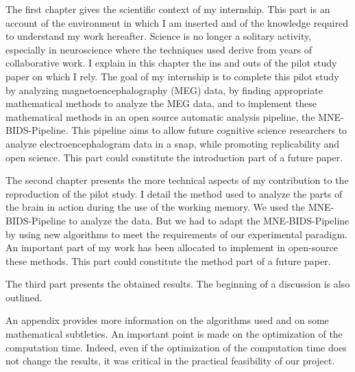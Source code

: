 The first chapter gives the scientific context of my internship. This part is an account of the environment in which I am inserted and of the knowledge required to understand my work hereafter. Science is no longer a solitary activity, especially in neuroscience where the techniques used derive from years of collaborative work. I explain in this chapter the ins and outs of the pilot study paper \cite{herbst2021abstracting} on which I rely. The goal of my internship is to complete this pilot study by analyzing magnetoencephalography (MEG) data, by finding appropriate mathematical methods to analyze the MEG data, and to implement these mathematical methods in an open source automatic analysis pipeline, the MNE-BIDS-Pipeline. This pipeline aims to allow future cognitive science researchers to analyze electroencephalogram data in a snap, while promoting replicability and open science. This part could constitute the introduction part of a future paper.


The second chapter presents the more technical aspects of my contribution to the reproduction of the pilot study. I detail the method used to analyze the parts of the brain in action during the use of the working memory. We used the MNE-BIDS-Pipeline to analyze the data. But we had to adapt the MNE-BIDS-Pipeline by using new algorithms to meet the requirements of our experimental paradigm. An important part of my work has been allocated to implement in open-source these methods. This part could constitute the method part of a future paper.


The third part presents the obtained results. The beginning of a discussion is also outlined.

An appendix provides more information on the algorithms used and on some mathematical subtleties. An important point is made on the optimization of the computation time. Indeed, even if the optimization of the computation time does not change the results, it was critical in the practical feasibility of our project.